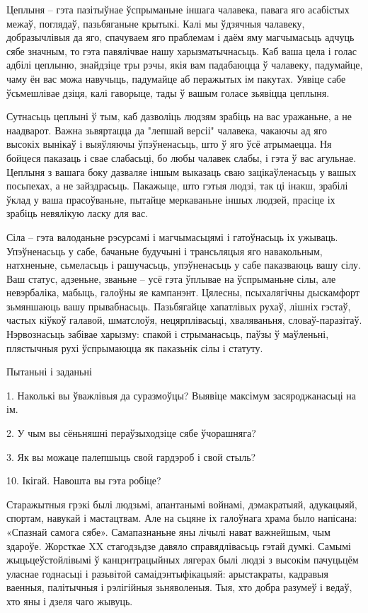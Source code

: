 Цеплыня – гэта пазітыўнае ўспрыманьне іншага чалавека, павага яго асабістых межаў, поглядаў, пазьбяганьне крытыкі. Калі мы ўдзячныя чалавеку, добразычлівыя да яго, спачуваем яго праблемам і даём яму магчымасьць адчуць сябе значным, то гэта павялічвае нашу харызматычнасьць. Каб ваша цела і голас адбілі цеплыню, знайдзіце тры рэчы, якія вам падабаюцца ў чалавеку, падумайце, чаму ён вас можа навучыць, падумайце аб перажытых ім пакутах. Уявіце сабе ўсьмешлівае дзіця, калі гаворыце, тады ў вашым голасе зьявіцца цеплыня.

Сутнасьць цеплыні ў тым, каб дазволіць людзям зрабіць на вас уражаньне, а не наадварот. Важна зьвяртацца да "лепшай версіі" чалавека, чакаючы ад яго высокіх вынікаў і выяўляючы ўпэўненасьць, што ў яго ўсё атрымаецца. Ня бойцеся паказаць і свае слабасьці, бо любы чалавек слабы, і гэта ў вас агульнае. Цеплыня з вашага боку дазваляе іншым выказаць сваю зацікаўленасьць у вашых посьпехах, а не зайздрасьць. Пакажыце, што гэтыя людзі, так ці інакш, зрабілі ўклад у ваша прасоўваньне, пытайце меркаваньне іншых людзей, прасіце іх зрабіць невялікую ласку для вас.

Сіла – гэта валоданьне рэсурсамі і магчымасьцямі і гатоўнасьць іх ужываць. Упэўненасьць у сабе, бачаньне будучыні і трансьляцыя яго навакольным, натхненьне, сьмеласьць і рашучасьць, упэўненасьць у сабе паказваюць вашу сілу. Ваш статус, адзеньне, званьне – усё гэта ўплывае на ўспрыманьне сілы, але невэрбаліка, мабыць, галоўны яе кампанэнт. Цялесны, псыхалягічны дыскамфорт зьмяншаюць вашу прывабнасьць. Пазьбягайце хапатлівых рухаў, лішніх гэстаў, частых кіўкоў галавой, шматслоўя, нецярплівасьці, хваляваньня, словаў-паразітаў. Нэрвознасьць забівае харызму: спакой і стрыманасьць, паўзы ў маўленьні, плястычныя рухі ўспрымаюцца як паказьнік сілы і статуту.

Пытаньні і заданьні

1. Наколькі вы ўважлівыя да суразмоўцы? Выявіце максімум засяроджанасьці на ім.

2. У чым вы сёньняшні пераўзыходзіце сябе ўчорашняга?

3. Як вы можаце палепшыць свой гардэроб і свой стыль?


10. Ікігай. Навошта вы гэта робіце?

Старажытныя грэкі былі людзьмі, апантанымі войнамі, дэмакратыяй, адукацыяй, спортам, навукай і мастацтвам. Але на сьцяне іх галоўнага храма было напісана: «Спазнай самога сябе». Самапазнаньне яны лічылі нават важнейшым, чым здароўе. Жорсткае XX стагодзьдзе давяло справядлівасьць гэтай думкі. Самымі жыцьцеўстойлівымі ў канцэнтрацыйных лягерах былі людзі з высокім пачуцьцём уласнае годнасьці і разьвітой самаідэнтыфікацыяй: арыстакраты, кадравыя ваенныя, палітычныя і рэлігійныя зьняволеныя. Тыя, хто добра разумеў і ведаў, хто яны і дзеля чаго жывуць.

